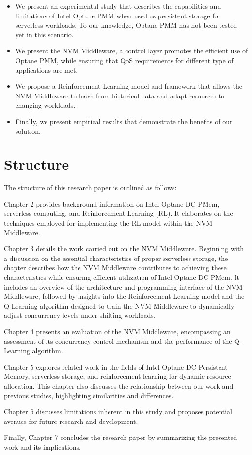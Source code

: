\begin{itemize}
    \item We present an experimental study that describes the capabilities and limitations of Intel Optane PMM when used as persistent storage for serverless workloads. To our knowledge, Optane PMM has not been tested yet in this scenario.
    \item We present the NVM Middleware, a control layer promotes the efficient use of Optane PMM, while ensuring that QoS requirements for different type of applications are met.
    \item We propose a Reinforcement Learning model and framework that allows the NVM Middleware to learn from historical data and adapt resources to changing workloads.
    \item Finally, we present empirical results that demonstrate the benefits of our solution.
\end{itemize}

\section{Structure}

The structure of this research paper is outlined as follows:

Chapter 2 provides background information on Intel Optane DC PMem, serverless computing, and Reinforcement Learning (RL). It elaborates on the techniques employed for implementing the RL model within the NVM Middleware.

Chapter 3 details the work carried out on the NVM Middleware. Beginning with a discussion on the essential characteristics of proper serverless storage, the chapter describes how the NVM Middleware contributes to achieving these characteristics while ensuring efficient utilization of Intel Optane DC PMem. It includes an overview of the architecture and programming interface of the NVM Middleware, followed by insights into the Reinforcement Learning model and the Q-Learning algorithm designed to train the NVM Middleware to dynamically adjust concurrency levels under shifting workloads.

Chapter 4 presents an evaluation of the NVM Middleware, encompassing an assessment of its concurrency control mechanism and the performance of the Q-Learning algorithm.

Chapter 5 explores related work in the fields of Intel Optane DC Persistent Memory, serverless storage, and reinforcement learning for dynamic resource allocation. This chapter also discusses the relationship between our work and previous studies, highlighting similarities and differences.

Chapter 6 discusses limitations inherent in this study and proposes potential avenues for future research and development.

Finally, Chapter 7 concludes the research paper by summarizing the presented work and its implications.